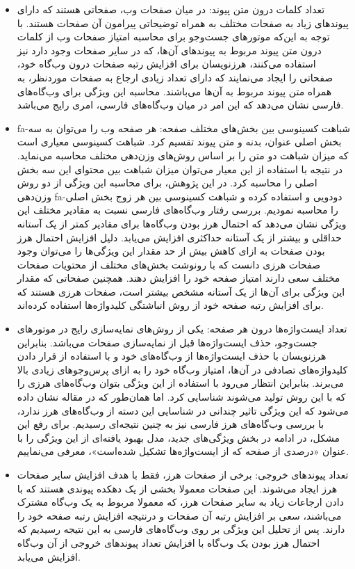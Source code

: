 \documentclass[twoside, a4paper,11pt]{book}
\numberwithin{equation}{chapter}
\numberwithin{table}{chapter}
\numberwithin{figure}{chapter}
\numberwithin{equation}{chapter}
\newcommand{\mls}[1]{\gls{fa-#1}\glsuseri{la-#1}}
\begin{document}
\begin{itemize}
\item
تعداد کلمات درون متن پیوند: در میان صفحات وب، صفحاتی هستند که دارای پیوندهای زیاد به صفحات مختلف به همراه توضیحاتی پیرامون آن صفحات هستند. با توجه به این‌که موتورهای جست‌و‌جو برای محاسبه امتیاز صفحات وب از کلمات درون متن پیوند مربوط به پیوندهای آن‌ها، که در سایر صفحات وجود دارد نیز استفاده می‌کنند، هرزنویسان برای افزایش رتبه صفحات درون وب‌گاه خود، صفحاتی را ایجاد می‌نمایند که دارای تعداد زیادی ارجاع به صفحات موردنظر، به همراه متن پیوند مربوط به آن‌ها می‌باشند. محاسبه این ویژگی برای وب‌گاه‌های فارسی نشان می‌دهد که این امر در میان وب‌گاه‌های فارسی، امری رایج می‌باشد.
\item
 \mls{شباهت کسینوسی} \cite{wong1987modeling} بین بخش‌های مختلف صفحه: هر صفحه وب را می‌توان به سه بخش اصلی عنوان، بدنه و متن پیوند تقسیم کرد. شباهت کسینوسی معیاری است که میزان شباهت دو متن را بر اساس روش‌های وزن‌دهی مختلف محاسبه می‌نماید. در نتیجه با استفاده از این معیار می‌توان میزان شباهت بین محتوای این سه بخش اصلی را محاسبه کرد. در این پژوهش، برای محاسبه این ویژگی از دو روش وزن‌دهی \mls{دودویی} و  استفاده کرده و شباهت کسینوسی بین هر زوج بخش اصلی را محاسبه نمودیم. بررسی رفتار وب‌گاه‌های فارسی نسبت به مقادیر مختلف این ویژگی نشان می‌دهد که احتمال هرز بودن وب‌گاه‌ها برای مقادیر کمتر از یک آستانه حداقلی و بیشتر از یک آستانه حداکثری افزایش می‌یابد. دلیل افزایش احتمال هرز بودن صفحات به ازای کاهش بیش از حد مقدار این ویژگی‌ها را می‌توان وجود صفحات هرزی دانست که با رونوشت بخش‌های مختلف از محتویات صفحات مختلف سعی دارند امتیاز صفحه خود را افزایش دهند. همچنین صفحاتی که مقدار این ویژگی برای آن‌ها از یک آستانه مشخص بیشتر است، صفحات هرزی هستند که برای افزایش رتبه صفحه خود از روش انباشتگی کلید‌واژه‌ها استفاده کرده‌اند.
\item
تعداد ایست‌واژه‌ها درون هر صفحه: یکی از روش‌‌های نمایه‌سازی رایج در موتورهای جست‌و‌جو، حذف ایست‌واژه‌ها قبل از نمایه‌سازی صفحات می‌باشد. بنابراین هرزنویسان با حذف ایست‌واژه‌ها از وب‌گاه‌های خود و با استفاده از قرار دادن کلیدواژه‌های تصادفی در آن‌ها، امتیاز وب‌گاه خود را به ازای پرس‌وجوهای زیادی بالا می‌برند. بنابراین انتظار می‌رود با استفاده از این ویژگی بتوان وب‌گاه‌های هرزی را که با این روش تولید می‌شوند شناسایی کرد. اما همان‌طور که در مقاله \cite{Prieto:2013} نشان داده می‌شود که این ویژگی تاثیر چندانی در شناسایی این دسته از وب‌گاه‌های هرز ندارد، با بررسی وب‌گاه‌های هرز فارسی نیز به چنین نتیجه‌ای رسیدیم. برای رفع این مشکل، در ادامه در بخش ویژگی‌های جدید، مدل بهبود یافته‌ای از این ویژگی را با عنوان «درصدی از صفحه که از ایست‌واژه‌ها تشکیل شده‌است»، معرفی می‌نماییم. 
\item
تعداد پیوندهای خروجی: برخی از صفحات هرز، فقط با هدف افزایش  سایر صفحات هرز ایجاد می‌شوند. این صفحات معمولا بخشی از یک دهکده پیوندی هستند که با دادن ارجاعات زیاد به سایر صفحات هرز، که معمولا مربوط به یک وب‌گاه مشترک می‌باشند، سعی بر افزایش رتبه آن صفحات و درنتیجه افزایش رتبه صفحه خود را دارند. پس از تحلیل این ویژگی بر روی وب‌گاه‌های فارسی به این نتیجه رسیدیم که احتمال هرز بودن یک وب‌گاه با افزایش تعداد پیوند‌های خروجی از آن وب‌گاه افزایش می‌یابد. 
\end{itemize}
\end{document}

